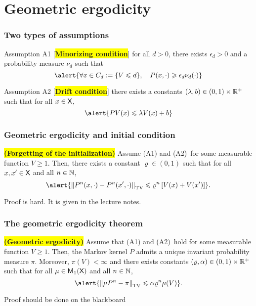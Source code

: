 \documentclass[usenames,dvipsnames]{beamer}
\newcommand\mycoltwo[1]{{\color{blue}#1}}
\newcommand\mycolthree[1]{{\color{Emerald}#1}}
\newcommand\colbox[1]{\colorbox{Yellow}{#1}}
\begin{document}
\section{Geometric ergodicity}

\begin{frame}
    \frametitle{Two types of assumptions}

        \begin{block}{Assumption A1}
         [\colbox{\bf Minorizing condition}] for all $d>0$, there exists $\epsilon_d>0$ and a probability measure $\nu_d$ such that 
        \begin{equation}
        \label{eq:minor}
        \alert{\forall x\in C_d\eqdef\{V\leq d\}, \quad
        P(x,\cdot) \geq \epsilon_d \nu_d(\cdot)}
        \end{equation}
        \end{block}
        \pause
        \begin{block}{Assumption A2}
         [\colbox{\bf Drift condition}] there exists a constants $(\lambda,b)\in (0,1) \times \mathbb{R}^+$ such that for all $x\in\mathsf{X}$,
        $$
        \alert{PV(x) \leq \lambda V(x)+b}
        $$
        \end{block}
        

\end{frame}
\begin{frame}
    \frametitle{Geometric ergodicity and initial condition}
    \begin{theorem}{\colbox{\textbf{(Forgetting of the initialization)}}}\label{thm:ergo:geom}  
        Assume (A1) and (A2)\  for some measurable function $V\geq1$.
        \pause
        Then, there exists a constant $\varrho \in (0,1)$ such that for all $x,x'\in\mathsf{X}$ and all $n\in\mathbb{N}$,
        $$
        \alert{\tvnorm{P^n(x,\cdot)-P^n(x',\cdot)} \leq \varrho^n \lrb{V(x)+V(x')}}  .
        $$
        \end{theorem}
       \mycolthree{Proof is hard. It is given in the lecture notes.} 
\end{frame}
\begin{frame}
    \frametitle{The geometric ergodicity theorem}
    \begin{corollary}{\colbox{\bf (Geometric ergodicity)}} \label{cor:ergod}
        Assume that (A1) and (A2)\ hold for some measurable function $V\geq 1$. \pause Then, the Markov kernel $P$ admits a \mycoltwo{unique invariant probability measure $\pi$}. \pause Moreover, $\pi(V)<\infty$ and there exists constants $(\varrho,\alpha) \in (0,1) \times \mathbb{R}^+$ such that for all $\mu\in\mathsf{M}_{1}(\mathsf{X})$ and all $n\in\mathbb{N}$,
        $$
        \alert{\tvnorm{\mu P^n-\pi} \leq \alpha \varrho^n \mu(V)}  .
        $$
        \end{corollary}
        \mycolthree{Proof should be done on the blackboard}
    

\end{frame}
\end{document}
